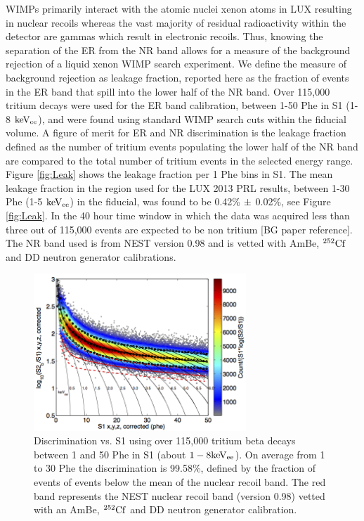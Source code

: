 WIMPs primarily interact with the atomic nuclei xenon atoms in LUX resulting in nuclear recoils whereas the vast majority of residual radioactivity within the detector are gammas which result in electronic recoils. Thus, knowing the separation of the ER from the NR band allows for a measure of the background rejection of a liquid xenon WIMP search experiment. We define the measure of background rejection as leakage fraction, reported here as the fraction of events in the ER band that spill into the lower half of the NR band. Over 115,000 tritium decays were used for the ER band calibration, between 1-50 Phe in S1 (1-8 $\rm keV_{ee}$), and were found using standard WIMP search cuts within the fiducial volume. A figure of merit for ER and NR discrimination is the leakage fraction defined as  the number of tritium events populating the lower half of the NR band are compared to the total number of tritium events in the selected energy range. 
Figure \ref{fig:Leak} shows the leakage fraction per 1 Phe bins in S1. The mean leakage fraction in the region used for the LUX 2013 PRL results, between 1-30 Phe (1-5 $\rm keV_{ee}$) in the fiducial, was found to be 0.42\% $\rm \pm$ 0.02\%, see Figure \ref{fig:Leak}. In the 40 hour time window in which the data was acquired less than three out of 115,000 events are expected to be non tritium [BG paper reference]. The NR band used is from NEST version 0.98 and is vetted with AmBe, $\rm^{252}Cf$ and DD neutron generator calibrations.


\begin{figure}[h!]\centering
\includegraphics[width=80mm]{CH3T_fid_50_2_Dec_Tritium_Approval_Plots.png}
\caption{Discrimination vs. S1 using over 115,000 tritium beta decays between 1 and 50 Phe in S1 (about $\rm1-8 keV_{ee}$). On average from 1 to 30 Phe the discrimination is 99.58\%, defined by the fraction of events of events below the mean of the nuclear recoil band. The red band represents the NEST nuclear recoil band (version 0.98) vetted with an AmBe, $\rm^{252}Cf$ and DD neutron generator calibration.}
\label{fig:Band}
\end{figure}


